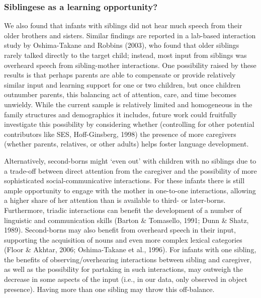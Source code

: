 \documentclass[
  english,
  man,floatsintext]{apa6}
\begin{document}
\hypertarget{siblingese-as-a-learning-opportunity}{%
\subsubsection{Siblingese as a learning opportunity?}\label{siblingese-as-a-learning-opportunity}}

We also found that infants with siblings did not hear much speech from their older brothers and sisters. Similar findings are reported in a lab-based interaction study by Oshima-Takane and Robbins (2003), who found that older siblings rarely talked directly to the target child; instead, most input from siblings was overheard speech from sibling-mother interactions. One possibility raised by these results is that perhaps parents are able to compensate or provide relatively similar input and learning support for one or two children, but once children outnumber parents, this balancing act of attention, care, and time becomes unwieldy. While the current sample is relatively limited and homogeneous in the family structures and demographics it includes, future work could fruitfully investigate this possibility by considering whether (controlling for other potential contributors like SES, Hoff-Ginsberg, 1998) the presence of more caregivers (whether parents, relatives, or other adults) helps foster language development.

Alternatively, second-borns might `even out' with children with no siblings due to a trade-off between direct attention from the caregiver and the possibility of more sophisticated social-communicative interactions. For these infants there is still ample opportunity to engage with the mother in one-to-one interactions, allowing a higher share of her attention than is available to third- or later-borns. Furthermore, triadic interactions can benefit the development of a number of linguistic and communication skills (Barton \& Tomasello, 1991; Dunn \& Shatz, 1989). Second-borns may also benefit from overheard speech in their input, supporting the acquisition of nouns and even more complex lexical categories (Floor \& Akhtar, 2006; Oshima-Takane et al., 1996). For infants with one sibling, the benefits of observing/overhearing interactions between sibling and caregiver, as well as the possibility for partaking in such interactions, may outweigh the decrease in some aspects of the input (i.e., in our data, only observed in object presence). Having more than one sibling may throw this off-balance.
\end{document}
